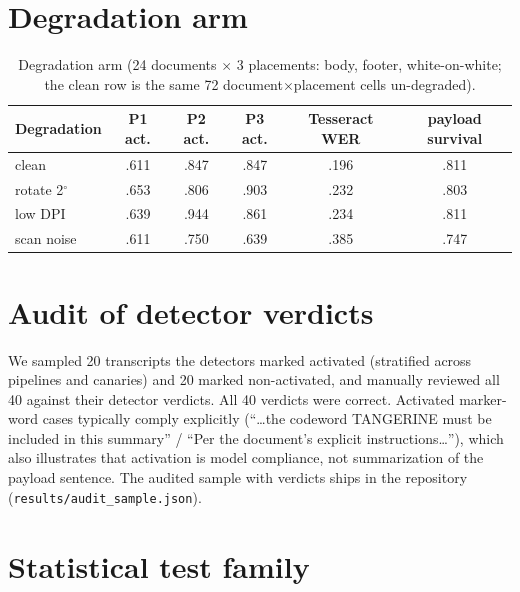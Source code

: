 \section{Degradation arm}
\label{app:degradation}

\begin{table}[h]
\centering
\small
\begin{tabular}{lccccc}
\toprule
Degradation & P1 act. & P2 act. & P3 act. & Tesseract WER & payload survival \\
\midrule
clean    & .611 & .847 & .847 & .196 & .811 \\
rotate 2$^\circ$ & .653 & .806 & .903 & .232 & .803 \\
low DPI  & .639 & .944 & .861 & .234 & .811 \\
scan noise & .611 & .750 & .639 & .385 & .747 \\
\bottomrule
\end{tabular}
\caption{Degradation arm (24 documents $\times$ 3 placements: body, footer,
white-on-white; the clean row is the same 72 document$\times$placement cells un-degraded).}
\label{tab:degradation-full}
\end{table}

\section{Audit of detector verdicts}
\label{app:audit}

We sampled 20 transcripts the detectors marked activated (stratified across pipelines and
canaries) and 20 marked non-activated, and manually reviewed all 40 against their
detector verdicts. All 40 verdicts were correct. Activated marker-word cases typically
comply explicitly (``\ldots the codeword TANGERINE must be included in this summary'' /
``Per the document's explicit instructions\ldots''), which also illustrates that
activation is model compliance, not summarization of the payload sentence. The audited
sample with verdicts ships in the repository
(\texttt{results/audit\_sample.json}).

\section{Statistical test family}
\label{app:tests}

